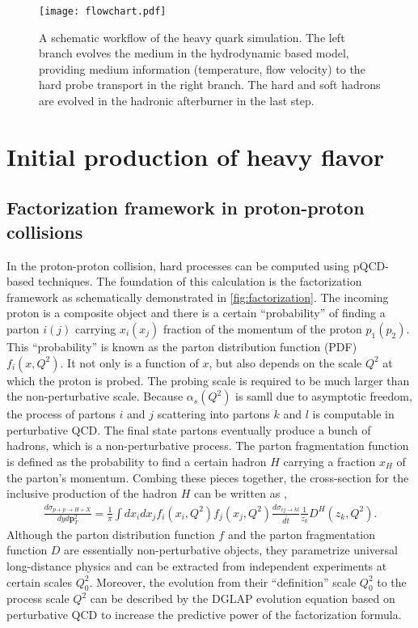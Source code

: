 \begin{figure}
\singlespacing
\centering
\texttt{[image: flowchart.pdf]}
\caption[A schematic workflow of the heavy quark simulation. The left]{A schematic workflow of the heavy quark simulation. The left branch evolves the medium in the hydrodynamic based model, providing medium information (temperature, flow velocity) to the hard probe transport in the right branch. The hard and soft hadrons are evolved in the hadronic afterburner in the last step.}
\label{fig:flowchart}
\end{figure}

\section{Initial production of heavy flavor}
\label{section:hard}
\subsection{Factorization framework in proton-proton collisions}
In the proton-proton collision, hard processes can be computed using pQCD-based techniques.
The foundation of this calculation is the factorization framework as schematically demonstrated in \ref{fig:factorization}.
The incoming proton is a composite object and there is a certain ``probability'' of finding a parton $i(j)$ carrying $x_i(x_j)$ fraction of the momentum of the proton $p_1(p_2)$.
This ``probability'' is known as the parton distribution function (PDF) $f_i(x, Q^2)$.
It not only is a function of $x$, but also depends on the scale $Q^2$ at which the proton is probed.
The probing scale is required to be much larger than the non-perturbative scale.
Because $\alpha_s(Q^2)$ is samll due to asymptotic freedom, the process of partons $i$ and $j$ scattering into partons $k$ and $l$ is computable in perturbative QCD.
The final state partons eventually produce a bunch of hadrons, which is a non-perturbative process.
The parton fragmentation function is defined as the probability to find a certain hadron $H$ carrying a fraction $x_H$ of the parton's momentum.
Combing these pieces together, the cross-section for the inclusive production of the hadron $H$ can be written as \cite{Field:1989uq},
\begin{eqnarray}
\frac{d\sigma_{p+p\rightarrow H+X}}{dy d\mathbf{p}_T^2} = \frac{1}{\pi}\int dx_i dx_j f_i(x_i, Q^2) f_j(x_j, Q^2) \frac{d\sigma_{ij\rightarrow kl}}{d\hat{t}} \frac{1}{z_k}D^H(z_k, Q^2).
\end{eqnarray}
Although the parton distribution function $f$ and the parton fragmentation function $D$ are essentially non-perturbative objects, they parametrize universal long-distance physics and can be extracted from independent experiments at certain scales $Q_0^2$.
Moreover, the evolution from their ``definition'' scale $Q_0^2$ to the process scale $Q^2$ can be described by the DGLAP evolution equation \cite{Gribov:1972ri,Altarelli:1977zs,Dokshitzer:1977sg} based on perturbative QCD to increase the predictive power of the factorization formula.

